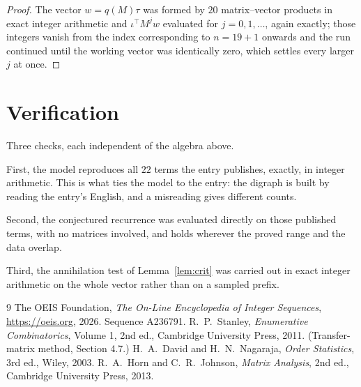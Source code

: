 \documentclass[11pt,a4paper]{article}
\theoremstyle{plain}
\theoremstyle{definition}
\begin{document}
\begin{proof}
The vector $w=q(M)\tau$ was formed by $20$ matrix--vector products in exact integer
arithmetic and $\iota^{\!\top}M^{j}w$ evaluated for $j=0,1,\dots$, again exactly; those
integers vanish from the index corresponding to $n=19+1$ onwards and the run continued
until the working vector was identically zero, which settles every larger $j$ at once.
\end{proof}

\section{Verification}

Three checks, each independent of the algebra above.

First, the model reproduces all $22$ terms the entry publishes, exactly, in integer
arithmetic. This is what ties the model to the entry: the digraph is built by reading the
entry's English, and a misreading gives different counts.

Second, the conjectured recurrence was evaluated directly on those published terms, with no
matrices involved, and holds wherever the proved range and the data overlap.

Third, the annihilation test of Lemma~\ref{lem:crit} was carried out in exact integer
arithmetic on the whole vector rather than on a sampled prefix.

\begin{thebibliography}{9}
 The OEIS Foundation, \emph{The On-Line Encyclopedia of Integer
Sequences}, \url{https://oeis.org}, 2026. Sequence A236791.
 R.~P.~Stanley, \emph{Enumerative Combinatorics}, Volume 1, 2nd ed.,
Cambridge University Press, 2011. (Transfer-matrix method, Section 4.7.)
 H.~A.~David and H.~N.~Nagaraja, \emph{Order Statistics}, 3rd ed., Wiley,
2003.
 R.~A.~Horn and C.~R.~Johnson, \emph{Matrix Analysis}, 2nd ed., Cambridge
University Press, 2013.
\end{thebibliography}
\end{document}
